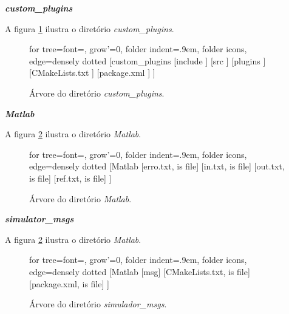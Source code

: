 \vspace{0.5em}
\noindent 
\textbf{\emph{custom\_plugins}}
\vspace{0.5em}

A figura \ref{fig:arvore_customplugins} ilustra o diretório \emph{custom\_plugins}.

\begin{tiny}
	\begin{figure}[htbp]
		\begin{forest}
			for tree={font=\sffamily, grow'=0,
				folder indent=.9em, folder icons,
				edge=densely dotted}
			[custom\_plugins
			[include
			]
			[src
			]
			[plugins
			]
			[CMakeLists.txt
			]
			[package.xml
			]
			]
		\end{forest}
		\caption{Árvore do diretório \emph{custom\_plugins}.}
		\label{fig:arvore_customplugins}
	\end{figure}
\end{tiny}

\vspace{0.5em}
\noindent 
\textbf{\emph{Matlab}}
\vspace{0.5em}

A figura \ref{fig:arvore_matlab} ilustra o diretório \emph{Matlab}.

\begin{tiny}
	\begin{figure}[htbp]
		\begin{forest}
			for tree={font=\sffamily, grow'=0,
				folder indent=.9em, folder icons,
				edge=densely dotted}
			[Matlab
			[erro.txt, is file]
			[in.txt, is file]
			[out.txt, is file]
			[ref.txt, is file]
			]
		\end{forest}
		\caption{Árvore do diretório \emph{Matlab}.}
		\label{fig:arvore_matlab}
	\end{figure}
\end{tiny}

\vspace{0.5em}
\noindent 
\textbf{\emph{simulator\_msgs}}
\vspace{0.5em}

A figura \ref{fig:arvore_matlab} ilustra o diretório \emph{Matlab}.

\begin{tiny}
	\begin{figure}[htbp]
		\begin{forest}
			for tree={font=\sffamily, grow'=0,
				folder indent=.9em, folder icons,
				edge=densely dotted}
			[Matlab
			[msg]
			[CMakeLists.txt, is file]
			[package.xml, is file]
			]
		\end{forest}
		\caption{Árvore do diretório \emph{simulador\_msgs}.}
		\label{fig:arvore_simuladormsgs}
	\end{figure}
\end{tiny}

